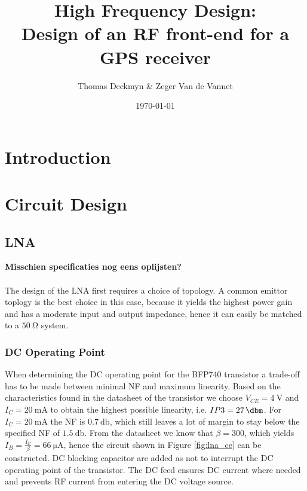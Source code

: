 \documentclass[a4paper]{article}        %
\title{High Frequency Design: \\ Design of an RF front-end for a GPS receiver}
\author{Thomas Deckmyn \& Zeger Van de Vannet}
\date{\today}
\begin{document}
\maketitle

\tableofcontents

\section{Introduction}
\section{Circuit Design}
	\subsection{LNA}

	\textbf{Misschien specificaties nog eens oplijsten?}\\\\
	The design of the LNA first requires a choice of topology. A common emittor toplogy is the best choice in this case, because it yields the highest power gain and has a moderate input and output impedance, hence it can easily be matched to a $\SI{50}{\ohm}$ system.
		\subsubsection{DC Operating Point}
			When determining the DC operating point for the BFP740 transistor a trade-off has to be made between minimal NF and maximum linearity. Based on the characteristics found in the datasheet\cite{transdatasheet} of the transistor we choose $V_{CE} = \SI{4}{\volt}$ and $I_C = \SI{20}{\milli\ampere}$ to obtain the highest possible linearity, i.e. $IP3 = \SI{27}{\dbm} $. For $I_C = \SI{20}{\milli\ampere}$ the NF is $\SI{0.7}{\decibel}$, which still leaves a lot of margin to stay below the specified NF of $\SI{1.5}{\decibel}$. From the datasheet we know that $\beta = 300$, which yields $I_B = \frac{I_C}{\beta} = \SI{66}{\micro\ampere}$, hence the circuit shown in Figure \ref{fig:lna_ce} can be constructed. DC blocking capacitor are added as not to interrupt the DC operating point of the transistor. The DC feed ensures DC current where needed and prevents RF current from entering the DC voltage source. \\
\end{document}
